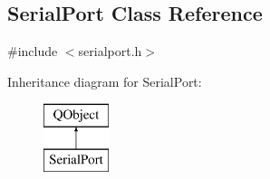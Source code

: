\hypertarget{classSerialPort}{}\subsection{Serial\+Port Class Reference}
\label{classSerialPort}


{\ttfamily \#include $<$serialport.\+h$>$}

Inheritance diagram for Serial\+Port\+:\begin{figure}[H]
\begin{center}
\leavevmode
\includegraphics[height=2.000000cm]{classSerialPort}
\end{center}
\end{figure}
